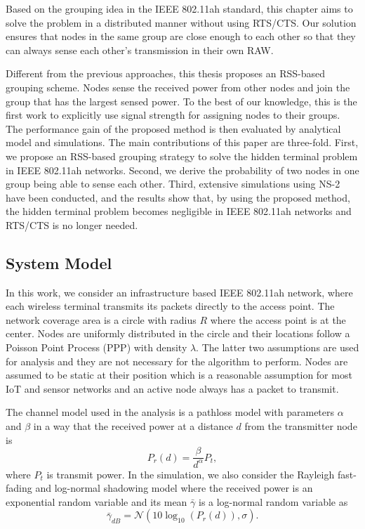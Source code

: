   Based on the grouping idea in the IEEE 802.11ah standard, this chapter aims to solve the problem in a distributed manner without using RTS/CTS. Our solution ensures that nodes in the same group are close enough to each other so that they can always sense each other's transmission in their own RAW. 

Different from the previous approaches, this thesis proposes an RSS-based grouping scheme.
Nodes sense the received power from other nodes and join the group that has the largest sensed power. To the best of our knowledge, this is the first work to explicitly use signal strength for assigning nodes to their groups. The performance gain of the proposed method is then evaluated by analytical model and simulations. The main contributions of this paper are three-fold. First, we propose an RSS-based grouping strategy to solve the hidden terminal problem in IEEE 802.11ah networks. Second, we derive the probability of two nodes in one group being able to sense each other. Third, extensive simulations using NS-2\cite{breslau2000advances} have been conducted, and the results show that, by using the proposed method, the hidden terminal problem becomes negligible in IEEE 802.11ah networks and RTS/CTS is no longer needed.


\subsection{System Model} \label{systemmodel}

In this work, we consider an infrastructure based IEEE 802.11ah network, where each wireless terminal transmits its packets directly to the access point. %
The network coverage area is a circle with radius $R$ where the access point is at the center. Nodes are uniformly distributed in the circle and their locations follow a Poisson Point Process (PPP) with density $\lambda$. The latter two assumptions are used for analysis and they are not necessary for the algorithm to perform. Nodes are assumed to be static at their position which is a reasonable assumption for most IoT and sensor networks and an active node always has a packet to transmit. %

The channel model used in the analysis is a pathloss model with parameters $\alpha$ and $\beta$ in a way that the received power at a distance $d$ from the transmitter node is
\begin{equation}
P_r(d)=\frac{\beta}{d^\alpha} P_t,
\end{equation}
where $P_t$ is transmit power. In the simulation, we also consider the Rayleigh fast-fading and log-normal shadowing model where the received power is an exponential random variable and its mean $\bar{\gamma}$ is a log-normal random variable as 
\begin{equation}
\bar{\gamma}_{dB}= \mathcal{N}(10\log_{10}(P_r(d)),\sigma).
\end{equation}

